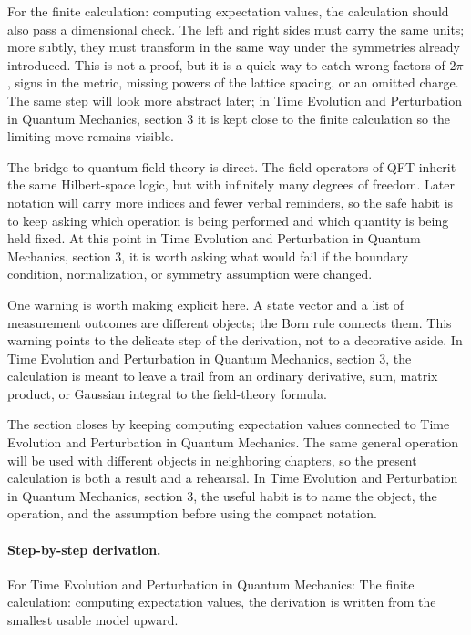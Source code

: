 For the finite calculation: computing expectation values, the calculation should also pass a dimensional check.  The left and right sides must carry the same units; more subtly, they must transform in the same way under the symmetries already introduced.  This is not a proof, but it is a quick way to catch wrong factors of \(2\pi\), signs in the metric, missing powers of the lattice spacing, or an omitted charge.  The same step will look more abstract later; in Time Evolution and Perturbation in Quantum Mechanics, section 3 it is kept close to the finite calculation so the limiting move remains visible.

The bridge to quantum field theory is direct.  The field operators of QFT inherit the same Hilbert-space logic, but with infinitely many degrees of freedom.  Later notation will carry more indices and fewer verbal reminders, so the safe habit is to keep asking which operation is being performed and which quantity is being held fixed.  At this point in Time Evolution and Perturbation in Quantum Mechanics, section 3, it is worth asking what would fail if the boundary condition, normalization, or symmetry assumption were changed.

One warning is worth making explicit here.  A state vector and a list of measurement outcomes are different objects; the Born rule connects them.  This warning points to the delicate step of the derivation, not to a decorative aside.  In Time Evolution and Perturbation in Quantum Mechanics, section 3, the calculation is meant to leave a trail from an ordinary derivative, sum, matrix product, or Gaussian integral to the field-theory formula.

The section closes by keeping computing expectation values connected to Time Evolution and Perturbation in Quantum Mechanics.  The same general operation will be used with different objects in neighboring chapters, so the present calculation is both a result and a rehearsal.  In Time Evolution and Perturbation in Quantum Mechanics, section 3, the useful habit is to name the object, the operation, and the assumption before using the compact notation.



\paragraph{Step-by-step derivation.}

For Time Evolution and Perturbation in Quantum Mechanics: The finite calculation: computing expectation values, the derivation is written from the smallest usable model upward.

